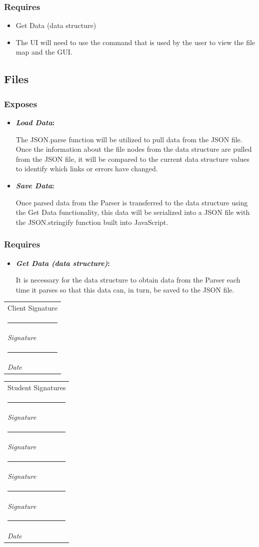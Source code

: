 \documentclass[letterpaper,10pt,titlepage,draftclsnofoot,onecolumn,onesided] {IEEEtran}
\makeatletter
\newcommand{\namesigdate}[2][4cm]{%
  \begin{tabular}{@{}p{#1}@{}}
    #2 \\[2\normalbaselineskip] \hrule \\[0pt]
    {\small \textit{Signature}} \\[2\normalbaselineskip] \hrule \\[0pt]
    {\small \textit{Date}}
  \end{tabular}
}
\newcommand{\studentnamesigdate}[2][4cm]{%
  \begin{tabular}{@{}p{#1}@{}}
    #2 \\[2\normalbaselineskip] \hrule \\[0pt]
    {\small \textit{Signature}} \\[2\normalbaselineskip] \hrule \\[0pt]
    {\small \textit{Signature}} \\[2\normalbaselineskip] \hrule \\[0pt]
    {\small \textit{Signature}} \\[2\normalbaselineskip] \hrule \\[0pt]
    {\small \textit{Signature}} \\[2\normalbaselineskip] \hrule \\[0pt]
    {\small \textit{Date}}
  \end{tabular}
}
\newcommand{\boldit}[2]{
	\textbf{\textit{#1}#2}
}
\makeatother
\begin{document}
\subsubsection{Requires}
\begin{itemize}
	\item Get Data (data structure)
	\item The UI will need to use the command that is used by the user to view the file map and the GUI.
\end{itemize}
		
\subsection{Files}

\subsubsection{Exposes}
\begin{itemize}
	\item \boldit{Load Data}{:}
The JSON.parse function will be utilized to pull data from the JSON file. 
Once the information about the file nodes from the data structure are pulled from the JSON file, it will be compared to the current data structure values to identify which links or errors have changed. \cite{stringify}
	\item \boldit{Save Data}{:}
Once parsed data from the Parser is transferred to the data structure using the Get Data functionality, this data will be serialized into a JSON file with the JSON.stringify function built into JavaScript.
\end{itemize}
		
\subsubsection{Requires}
\begin{itemize}
	\item \boldit{Get Data (data structure)}{:}
It is necessary for the data structure to obtain data from the Parser each time it parses so that this data can, in turn, be saved to the JSON file.
\end{itemize}





\pagebreak


\pagebreak

\namesigdate{Client Signature} \hfill 
\studentnamesigdate[4cm]{Student Signatures}
\end{document}
